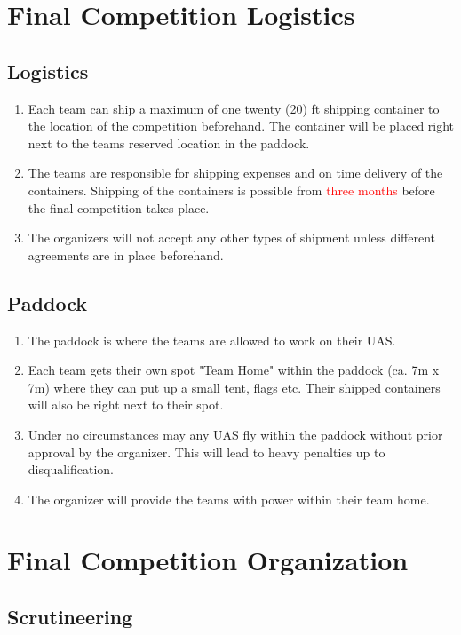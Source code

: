     \section{Final Competition Logistics}
    \subsection{Logistics}
    \begin{enumerate}
      \item Each team can ship a maximum of one twenty (20) ft shipping container to the location of the competition beforehand. The container will be placed right next to the teams reserved location in the paddock.
      \item The teams are responsible for shipping expenses and on time delivery of the containers. Shipping of the containers is possible from \textcolor{red}{three months }before the final competition takes place.
      \item The organizers will not accept any other types of shipment unless different agreements are in place beforehand.
    \end{enumerate}

    \subsection{Paddock}
    \begin{enumerate}
      \item The paddock is where the teams are allowed to work on their UAS. 
      \item Each team gets their own spot "Team Home" within the paddock (ca. 7m x 7m) where they can put up a small tent, flags etc. Their shipped containers will also be right next to their spot. 
      \item Under no circumstances may any UAS fly within the paddock without prior approval by the organizer. This will lead to heavy penalties up to disqualification. 
      \item The organizer will provide the teams with power within their team home.    
    \end{enumerate}


    \section{Final Competition Organization}

    \subsection{Scrutineering}

